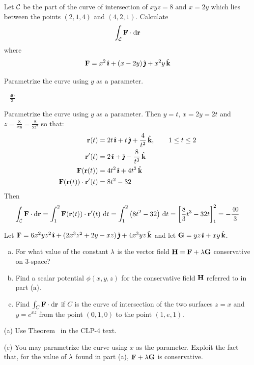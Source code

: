 \begin{question}[M317 1998D] %
Let $\mathcal{C}$ be the part of the curve of intersection of $xyz=8$
and $x=2y$ which lies between the points $(2,1,4)$ and $(4,2,1)$. Calculate
$$
\int_{\mathcal{C}} \mathbf{F}\cdot \mathrm{d}\mathbf{r}
$$
where
$$
\mathbf{F} = x^2\,\hat{\pmb{\imath}}+(x-2y)\,\hat{\pmb{\jmath}}+x^2 y\,\hat{\mathbf{k}}
$$
\end{question}

\begin{hint} 
Parametrize the curve using $y$ as a parameter. 
\end{hint}

\begin{answer}
$-\frac{40}{3}$
\end{answer}

\begin{solution} 
Parametrize the curve using $y$ as a parameter. Then $y=t$, $x=2y=2t$ and 
$z=\frac{8}{xy}=\frac{8}{2t^2}$ so that:
\begin{align*}
\mathbf{r}(t)&=2t\,\hat{\pmb{\imath}}+t\,\hat{\pmb{\jmath}}+\frac{4}{t^2}\,\hat{\mathbf{k}},\qquad 1\le t\le 2\\
\mathbf{r}'(t)&=2\,\hat{\pmb{\imath}}+\hat{\pmb{\jmath}}-\frac{8}{t^3}\,\hat{\mathbf{k}}\\
\mathbf{F}(\mathbf{r}(t))&= 4t^2\,\hat{\pmb{\imath}}+4t^3\,\hat{\mathbf{k}}\\
\mathbf{F}(\mathbf{r}(t))\cdot \mathbf{r}'(t)&=8t^2-32
\end{align*}
Then
$$
\int_{\mathcal{C}} \mathbf{F}\cdot \mathrm{d}\mathbf{r}
=\int_1^2 \mathbf{F}(\mathbf{r}(t))\cdot \mathbf{r}'(t)\ \mathrm{d}t
=\int_1^2 \big(8t^2-32\big)\ \mathrm{d}t
= \left[\frac{8}{3}t^3-32t\right]_1^2
=-\frac{40}{3}
$$

\end{solution}


\begin{question}
 Let  $\mathbf{F} = 6x^2yz^2\,\hat{\pmb{\imath}} + (2x^3z^2 + 2y - xz)\,\hat{\pmb{\jmath}} 
+ 4x^3yz\,\hat{\mathbf{k}}$ and let $\mathbf{G} = yz\,\hat{\pmb{\imath}} + xy\,\hat{\mathbf{k}}$. 
\begin{enumerate}[(a)]
\item 
For what value of the constant $\lambda$ is the vector field 
$\mathbf{H} = \mathbf{F} +  \lambda\mathbf{G}$ conservative on 3-space? 
\item
Find a scalar potential $\phi(x,y,z)$ for the conservative field $\mathbf{H}$ referred to in part (a). 
\item 
Find   $\int_C\mathbf{F}\cdot \mathrm{d}\mathbf{r}$ if $C$ is the curve of intersection of the two surfaces $z = x$ and $y = e^{xz}$ from the point $(0, 1, 0)$ to 
the point $(1, e, 1)$.
\end{enumerate} 
\end{question}

\begin{hint} 
(a) Use Theorem~ in the CLP-4 text.

(c) You may parametrize the curve using $x$ as the parameter.
Exploit the fact that, for the value of $\lambda$ found in part (a), $\mathbf{F}+\lambda \mathbf{G}$ is conservative.
\end{hint}

